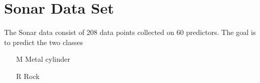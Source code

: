\section{Sonar Data Set}
The Sonar data consist of 208 data points collected on 60 predictors. 
The goal is to predict the two classes 

\begin{itemize}
\item[M] Metal cylinder 
\item[R] Rock
\end{itemize}
\begin{framed}
\begin{verbatim}

\end{verbatim}
\end{framed}



